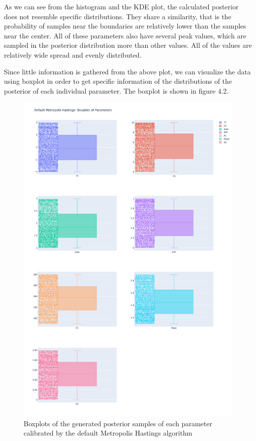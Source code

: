 As we can see from the histogram and the KDE plot, the calculated posterior does not resemble specific distributions. They share a similarity, that is the probability of samples near the boundaries are relatively lower than the samples near the center. All of these parameters also have several peak values, which are sampled in the posterior distribution more than other values. All of the values are relatively wide spread and evenly distributed.

Since little information is gathered from the above plot, we can visualize the data using boxplot in order to get specific information of the distributions of the posterior of each individual parameter. The boxplot is shown in figure 4.2.

\begin{figure}
    \centering
    \includegraphics[width=1\textwidth]{figures/basic_mh/default_mh/default_mh_boxplot.png}
    \captionsetup{width=.8\textwidth}
    \caption{Boxplots of the generated posterior samples of each parameter calibrated by the default Metropolis Hastings algorithm}
    \label{fig:enter-label}
\end{figure}


